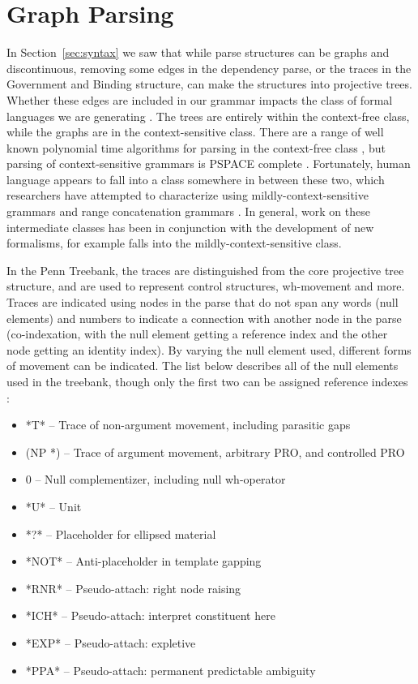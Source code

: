 \section{Graph Parsing}

In Section~\ref{sec:syntax} we saw that while parse structures can be graphs and discontinuous, removing some edges in the dependency parse, or the traces in the Government and Binding structure, can make the structures into projective trees.
Whether these edges are included in our grammar impacts the class of formal languages we are generating \parencite{Chomsky-grammars}.
The trees are entirely within the context-free class, while the graphs are in the context-sensitive class.
There are a range of well known polynomial time algorithms for parsing in the context-free class \parencite{Cocke:1969,Younger:1967,Kasami:1966,Earley:1970,Lang:1974}, but parsing of context-sensitive grammars is PSPACE complete \parencite{Kuroda:1964,Savitch:1970}.
Fortunately, human language appears to fall into a class somewhere in between these two, which researchers have attempted to characterize using mildly-context-sensitive grammars \textcite{weir-joshi:1988:ACL} and range concatenation grammars \parencite{Boullier:1998}.
In general, work on these intermediate classes has been in conjunction with the development of new formalisms, for example \ccg falls into the mildly-context-sensitive class.

In the Penn Treebank, the traces are distinguished from the core projective tree structure, and are used to represent control structures, wh-movement and more.
Traces are indicated using nodes in the parse that do not span any words (null elements) and numbers to indicate a connection with another node in the parse (co-indexation, with the null element getting a reference index and the other node getting an identity index).
By varying the null element used, different forms of movement can be indicated.
The list below describes all of the null elements used in the treebank, though only the first two can be assigned reference indexes \parencite{ptb-guide}:

\begin{itemize}
  \item *T* -- Trace of non-argument movement, including parasitic gaps
  \item (NP *) -- Trace of argument movement, arbitrary PRO, and controlled PRO
  \item 0 -- Null complementizer, including null wh-operator
  \item *U* -- Unit
  \item *?* -- Placeholder for ellipsed material
  \item *NOT* -- Anti-placeholder in template gapping
  \item *RNR* -- Pseudo-attach: right node raising
  \item *ICH* -- Pseudo-attach: interpret constituent here
  \item *EXP* -- Pseudo-attach: expletive
  \item *PPA* -- Pseudo-attach: permanent predictable ambiguity
\end{itemize}

